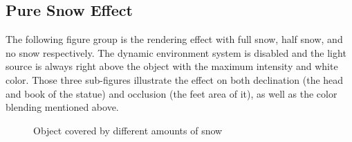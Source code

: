 \documentclass{article}
\begin{document}
\begin{itemize}
\subsection {Pure Snow Effect}
The following figure group is the rendering effect with full snow, half snow, and no snow respectively.
The dynamic environment system is disabled and the light source is always right above the object with
the maximum intensity and white color. Those three sub-figures illustrate the effect on both declination 
(the head and book of the statue) and occlusion (the feet area of it), as well as the color blending
mentioned above.

\begin{figure}[h]
  \centering
  \hfill
  \hfill
  \caption{Object covered by different amounts of snow}
  \label{fig:9}
\end{figure}


\end{itemize}
\end{document}
